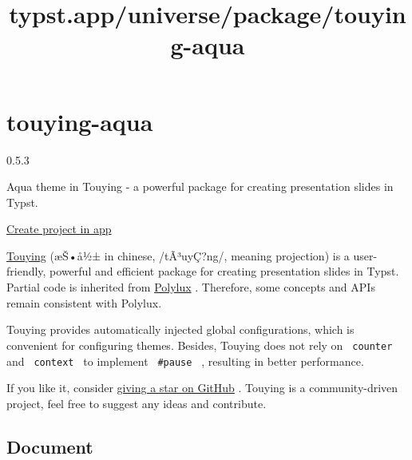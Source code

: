 \title{typst.app/universe/package/touying-aqua}

\label{banner}
\label{template-thumbnail}

\section{touying-aqua}\label{touying-aqua}

{ 0.5.3 }

Aqua theme in Touying - a powerful package for creating presentation
slides in Typst.

\href{/app?template=touying-aqua&version=0.5.3}{Create project in app}

\label{readme}
\href{https://github.com/touying-typ/touying}{Touying} (æŠ•å½± in
chinese, /tÃ³uyÇ?ng/, meaning projection) is a user-friendly, powerful
and efficient package for creating presentation slides in Typst. Partial
code is inherited from
\href{https://github.com/andreasKroepelin/polylux}{Polylux} . Therefore,
some concepts and APIs remain consistent with Polylux.

Touying provides automatically injected global configurations, which is
convenient for configuring themes. Besides, Touying does not rely on
\texttt{\ counter\ } and \texttt{\ context\ } to implement
\texttt{\ \#pause\ } , resulting in better performance.

If you like it, consider
\href{https://github.com/touying-typ/touying}{giving a star on GitHub} .
Touying is a community-driven project, feel free to suggest any ideas
and contribute.

\href{https://touying-typ.github.io/}{}
\href{https://github.com/touying-typ/touying/wiki}{}

\subsection{Document}\label{document}

